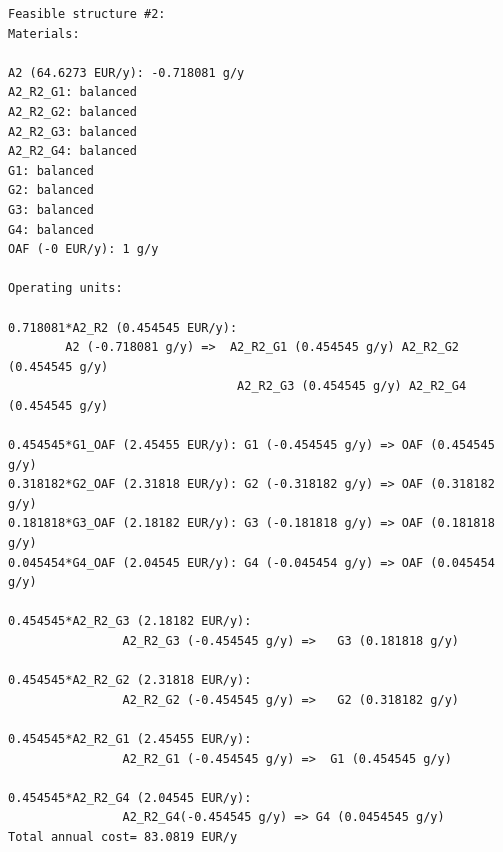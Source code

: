 \begin{lstlisting}[caption=Part from Graph.out]
Feasible structure #2:
Materials:

A2 (64.6273 EUR/y): -0.718081 g/y
A2_R2_G1: balanced
A2_R2_G2: balanced
A2_R2_G3: balanced
A2_R2_G4: balanced
G1: balanced
G2: balanced
G3: balanced
G4: balanced
OAF (-0 EUR/y): 1 g/y

Operating units:

0.718081*A2_R2 (0.454545 EUR/y): 
		A2 (-0.718081 g/y) =>  A2_R2_G1 (0.454545 g/y) A2_R2_G2 (0.454545 g/y) 
								A2_R2_G3 (0.454545 g/y) A2_R2_G4 (0.454545 g/y) 
								
0.454545*G1_OAF (2.45455 EUR/y): G1 (-0.454545 g/y) => OAF (0.454545 g/y) 
0.318182*G2_OAF (2.31818 EUR/y): G2 (-0.318182 g/y) => OAF (0.318182 g/y) 
0.181818*G3_OAF (2.18182 EUR/y): G3 (-0.181818 g/y) => OAF (0.181818 g/y) 
0.045454*G4_OAF (2.04545 EUR/y): G4 (-0.045454 g/y) => OAF (0.045454 g/y) 

0.454545*A2_R2_G3 (2.18182 EUR/y): 
				A2_R2_G3 (-0.454545 g/y) =>   G3 (0.181818 g/y) 
				
0.454545*A2_R2_G2 (2.31818 EUR/y):
				A2_R2_G2 (-0.454545 g/y) =>   G2 (0.318182 g/y) 
				
0.454545*A2_R2_G1 (2.45455 EUR/y): 
				A2_R2_G1 (-0.454545 g/y) =>  G1 (0.454545 g/y) 
				
0.454545*A2_R2_G4 (2.04545 EUR/y): 
				A2_R2_G4(-0.454545 g/y) => G4 (0.0454545 g/y) 
Total annual cost= 83.0819 EUR/y


\end{lstlisting}


